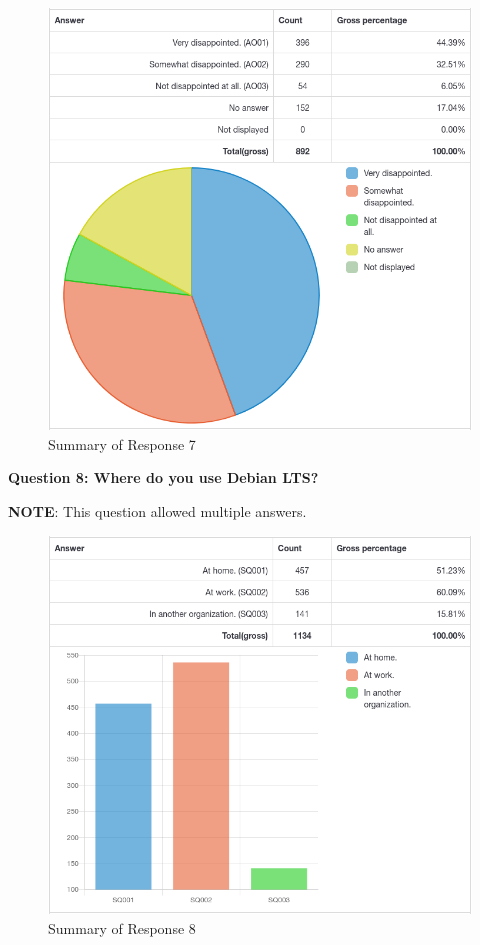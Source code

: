 \documentclass{article}
\begin{document}
\vspace{3mm}
\begin{figure}[h!]
\centering
\includegraphics[width=16.5cm]{assets/7-complete-responses.png}
\caption{Summary of Response 7}
\end{figure}

\newpage

\Large{\textbf{Question 8: Where do you use Debian LTS?}}

\vspace{4mm}
\large{\textbf{NOTE}: This question allowed multiple answers.}
\vspace{1mm}
\begin{figure}[h!]
\centering
\includegraphics[width=16.5cm]{assets/8-complete-responses.png}
\caption{Summary of Response 8}
\end{figure}
\end{document}
